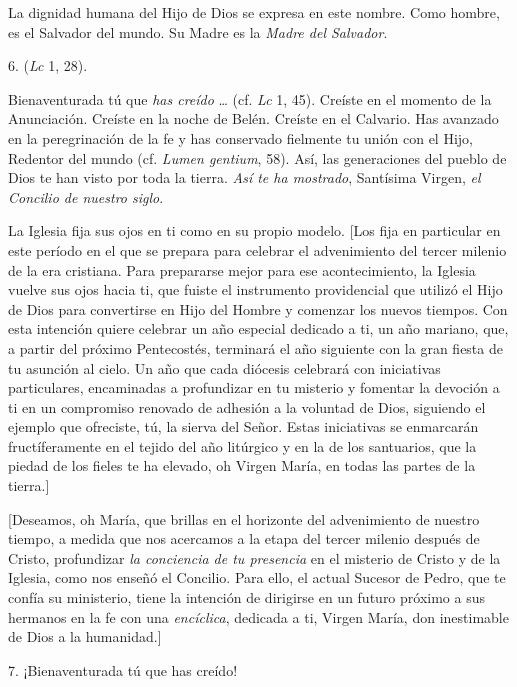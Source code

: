 \begin{body}
	La dignidad humana del Hijo de Dios se expresa en este nombre. Como hombre, es el Salvador del mundo. Su Madre es la \emph{Madre del 	Salvador}.

	6.  (\emph{Lc} 1, 28).

	Bienaventurada tú que \emph{has creído} \ldots{} (cf. \emph{Lc} 1, 45). Creíste en el momento de la Anunciación. Creíste en la noche de Belén. Creíste en el Calvario. Has avanzado en la peregrinación de la fe y has conservado fielmente tu unión con el Hijo, Redentor del mundo (cf. \emph{Lumen gentium}, 58). Así, las generaciones del pueblo de Dios te han visto por toda la tierra. \emph{Así te ha mostrado}, Santísima Virgen, \emph{el Concilio de nuestro siglo}.

	La Iglesia fija sus ojos en ti como en su propio modelo. {[}Los fija en particular en este período en el que se prepara para celebrar el advenimiento del tercer milenio de la era cristiana. Para prepararse mejor para ese acontecimiento, la Iglesia vuelve sus ojos hacia ti, que fuiste el instrumento providencial que utilizó el Hijo de Dios para convertirse en Hijo del Hombre y comenzar los nuevos tiempos. Con esta intención quiere celebrar un año especial dedicado a ti, un año mariano, que, a partir del próximo Pentecostés, terminará el año siguiente con la gran fiesta de tu asunción al cielo. Un año que cada diócesis celebrará con iniciativas particulares, encaminadas a profundizar en tu misterio y fomentar la devoción a ti en un compromiso renovado de adhesión a la voluntad de Dios, siguiendo el ejemplo que ofreciste, tú, la sierva del Señor. Estas iniciativas se enmarcarán fructíferamente en el tejido del año litúrgico y en la  de los santuarios, que la piedad de los fieles te ha elevado, oh Virgen María, en todas las partes de la tierra.{]}

	{[}Deseamos, oh María, que brillas en el horizonte del advenimiento de nuestro tiempo, a medida que nos acercamos a la etapa del tercer milenio después de Cristo, profundizar \emph{la conciencia de tu presencia} en el misterio de Cristo y de la Iglesia, como nos enseñó el Concilio. Para ello, el actual Sucesor de Pedro, que te confía su ministerio, tiene la intención de dirigirse en un futuro próximo a sus hermanos en la fe con una \emph{encíclica}, dedicada a ti, Virgen María, don inestimable de Dios a la humanidad.{]}

	7. ¡Bienaventurada tú que has creído!


\end{body}

